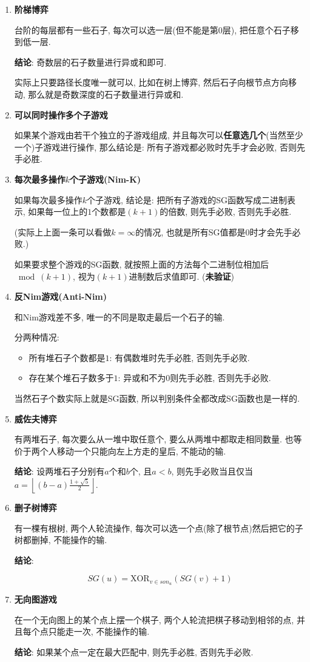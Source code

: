 \begin{enumerate}

\item \textbf{阶梯博弈}

台阶的每层都有一些石子, 每次可以选一层(但不能是第$0$层), 把任意个石子移到低一层.

\textbf{结论}: 奇数层的石子数量进行异或和即可.

实际上只要路径长度唯一就可以, 比如在树上博弈, 然后石子向根节点方向移动, 那么就是奇数深度的石子数量进行异或和.

\item \textbf{可以同时操作多个子游戏}

如果某个游戏由若干个独立的子游戏组成, 并且每次可以\textbf{任意选几个}(当然至少一个)子游戏进行操作, 那么结论是: 所有子游戏都必败时先手才会必败, 否则先手必胜.

\item \textbf{每次最多操作$k$个子游戏(Nim-K)}

如果每次最多操作$k$个子游戏, 结论是: 把所有子游戏的SG函数写成二进制表示, 如果每一位上的$1$个数都是$(k+1)$的倍数, 则先手必败, 否则先手必胜.

(实际上上面一条可以看做$k=\infty$的情况, 也就是所有SG值都是$0$时才会先手必败.)

如果要求整个游戏的SG函数, 就按照上面的方法每个二进制位相加后$\bmod (k+1)$, 视为$(k+1)$进制数后求值即可. (\textbf{未验证})

\item \textbf{反Nim游戏(Anti-Nim)}

和Nim游戏差不多, 唯一的不同是取走最后一个石子的输.

分两种情况:

\begin{itemize}
	\item 所有堆石子个数都是$1$: 有偶数堆时先手必胜, 否则先手必败.
	\item 存在某个堆石子数多于$1$: 异或和不为$0$则先手必胜, 否则先手必败.
\end{itemize}

当然石子个数实际上就是SG函数, 所以判别条件全都改成SG函数也是一样的.

\item \textbf{威佐夫博弈}

有两堆石子, 每次要么从一堆中取任意个, 要么从两堆中都取走相同数量. 也等价于两个人移动一个只能向左上方走的皇后, 不能动的输.

\textbf{结论}: 设两堆石子分别有$a$个和$b$个, 且$a<b$, 则先手必败当且仅当$a = \left\lfloor (b-a)\frac {1 + \sqrt 5} 2 \right\rfloor$.

\item \textbf{删子树博弈}

有一棵有根树, 两个人轮流操作, 每次可以选一个点(除了根节点)然后把它的子树都删掉, 不能操作的输.

\textbf{结论}:

$$ SG(u) = \text{XOR} _{v \in son_u} \left( SG(v) + 1 \right) $$

\item \textbf{无向图游戏}

在一个无向图上的某个点上摆一个棋子, 两个人轮流把棋子移动到相邻的点, 并且每个点只能走一次, 不能操作的输.

\textbf{结论}: 如果某个点一定在最大匹配中, 则先手必胜, 否则先手必败.

\end{enumerate}